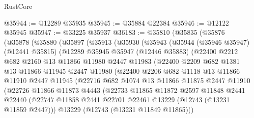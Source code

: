 \begin{lexlean}{RustCore}
\begin{coremodule}
@35944 := @12289 @35935
@35945 := @35884 @22384
@35946 := @12122 @35945
@35947 := @33225 @35937
@36183 := @35810
    (@35835
      (@35876
        (@35878
          (@35880
            (@35897
              (@35913
                (@35930
                  (@35943
                    (@35944
                      (@35946 @35947)
                      (@12441 @35815)
                      (@12289
                        @35945
                        @35947
                        (@12446 @35883)
                        (@22400
                          @2212
                          @682
                          @2160
                          @13
                          @11866
                          @11980
                          @2447
                          @11983
                          (@22400
                            @2209
                            @682
                            @1381
                            @13
                            @11866
                            @11945
                            @2447
                            @11980
                            (@22400
                              @2206
                              @682
                              @1118
                              @13
                              @11866
                              @11910
                              @2447
                              @11945
                              (@22716
                                @682
                                @1074
                                @13
                                @11866
                                @11875
                                @2447
                                @11910
                                (@22726
                                  @11866
                                  @11873
                                  @4443
                                  (@22733
                                    @11865
                                    @11872
                                    @2597
                                    @11848
                                    @2441
                                    @22440
                                    (@22747
                                      @11858
                                      @2441
                                      @22701
                                      @22461
                                      @13229
                                      (@12743 (@13231 @11859 @2447)))
                                    @13229
                                    (@12743 (@13231 @11849 @11865)))

\end{coremodule}
\end{lexlean}
